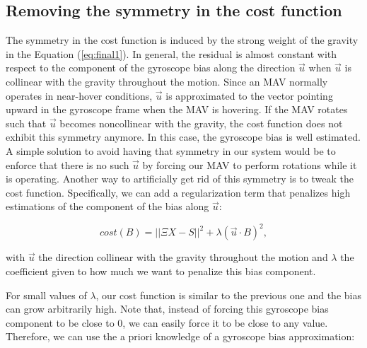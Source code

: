 \documentclass[letterpaper, 10 pt, journal, twoside]{IEEEtran}  %
\begin{document}
\subsection{Removing the symmetry in the cost function \label{sec:symmetry}}

The symmetry in the cost function is induced by the strong weight of the gravity in the Equation (\ref{eq:final1}).
In general, the residual is almost constant with respect to the component of the gyroscope bias along the direction $\vec{u}$ when $\vec{u}$ is collinear with the gravity throughout the motion.
Since an MAV normally operates in near-hover conditions, $\vec{u}$ is approximated to the vector pointing upward in the gyroscope frame when the MAV is hovering.
If the MAV rotates such that $\vec{u}$ becomes noncollinear with the gravity, the cost function does not exhibit this symmetry anymore.
In this case, the gyroscope bias is well estimated.
A simple solution to avoid having that symmetry in our system would be to enforce that there is no such $\vec{u}$ by forcing our MAV to perform rotations while it is operating.
Another way to artificially get rid of this symmetry is to tweak the cost function.
Specifically, we can add a regularization term that penalizes high estimations of the component of the bias along $\vec{u}$:

\begin{equation}
cost(B) = ||\Xi X - S||^2 + \lambda (\vec{u} \cdot B)^2,
\end{equation}


\noindent with $\vec{u}$ the direction collinear with the gravity throughout the motion and  $\lambda$ the coefficient given to how much we want to penalize this bias component.




For small values of $\lambda$, our cost function is similar to the previous one and the bias can grow arbitrarily high.
Note that, instead of forcing this gyroscope bias component to be close to $0$, we can easily force it to be close to any value.
Therefore, we can use the a priori knowledge of a gyroscope bias approximation:
\end{document}
